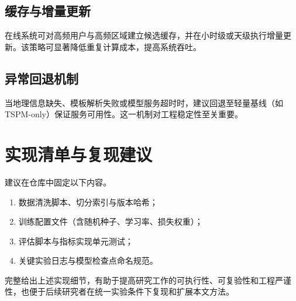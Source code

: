 \subsection{缓存与增量更新}
在线系统可对高频用户与高频区域建立候选缓存，并在小时级或天级执行增量更新。该策略可显著降低重复计算成本，提高系统吞吐。

\subsection{异常回退机制}
当地理信息缺失、模板解析失败或模型服务超时时，建议回退至轻量基线（如TSPM-only）保证服务可用性。这一机制对工程稳定性至关重要。

\section{实现清单与复现建议}
建议在仓库中固定以下内容。
\begin{enumerate}
    \item 数据清洗脚本、切分索引与版本哈希；
    \item 训练配置文件（含随机种子、学习率、损失权重）；
    \item 评估脚本与指标实现单元测试；
    \item 关键实验日志与模型检查点命名规范。
\end{enumerate}

完整给出上述实现细节，有助于提高研究工作的可执行性、可复验性和工程严谨性，也便于后续研究者在统一实验条件下复现和扩展本文方法。
